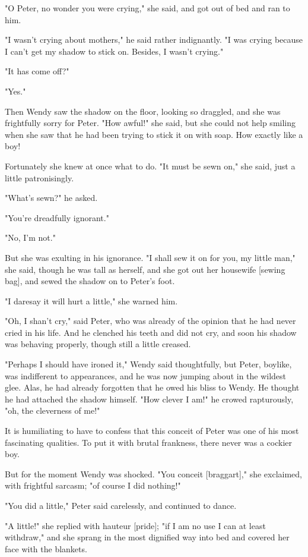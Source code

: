 "O Peter, no wonder you were crying," she said, and got out of bed and ran
to him.


"I wasn't crying about mothers," he said rather indignantly. "I was crying
because I can't get my shadow to stick on. Besides, I wasn't crying."


"It has come off?"


"Yes."


Then Wendy saw the shadow on the floor, looking so draggled, and she was
frightfully sorry for Peter. "How awful!" she said, but she could not help
smiling when she saw that he had been trying to stick it on with soap. How
exactly like a boy!


Fortunately she knew at once what to do. "It must be sewn on," she said,
just a little patronisingly.


"What's sewn?" he asked.


"You're dreadfully ignorant."


"No, I'm not."


But she was exulting in his ignorance. "I shall sew it on for you, my
little man," she said, though he was tall as herself, and she got out her
housewife [sewing bag], and sewed the shadow on to Peter's foot.


"I daresay it will hurt a little," she warned him.


"Oh, I shan't cry," said Peter, who was already of the opinion that he had
never cried in his life. And he clenched his teeth and did not cry, and
soon his shadow was behaving properly, though still a little creased.


"Perhaps I should have ironed it," Wendy said thoughtfully, but Peter,
boylike, was indifferent to appearances, and he was now jumping about in
the wildest glee. Alas, he had already forgotten that he owed his bliss to
Wendy. He thought he had attached the shadow himself. "How clever I am!"
he crowed rapturously, "oh, the cleverness of me!"


It is humiliating to have to confess that this conceit of Peter was one of
his most fascinating qualities. To put it with brutal frankness, there
never was a cockier boy.


But for the moment Wendy was shocked. "You conceit [braggart]," she
exclaimed, with frightful sarcasm; "of course I did nothing!"


"You did a little," Peter said carelessly, and continued to dance.


"A little!" she replied with hauteur [pride]; "if I am no use I can at
least withdraw," and she sprang in the most dignified way into bed and
covered her face with the blankets.


